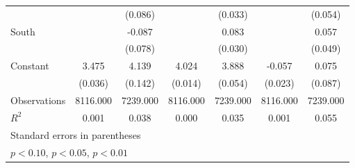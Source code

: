 {\begin{tabular}{l*{6}{c}}
                    &                     &     (0.086)         &                     &     (0.033)         &                     &     (0.054)         \\
\addlinespace
South               &                     &      -0.087         &                     &       0.083\sym{***}&                     &       0.057         \\
                    &                     &     (0.078)         &                     &     (0.030)         &                     &     (0.049)         \\
\addlinespace
Constant            &       3.475\sym{***}&       4.139\sym{***}&       4.024\sym{***}&       3.888\sym{***}&      -0.057\sym{**} &       0.075         \\
                    &     (0.036)         &     (0.142)         &     (0.014)         &     (0.054)         &     (0.023)         &     (0.087)         \\
\midrule
Observations        &    8116.000         &    7239.000         &    8116.000         &    7239.000         &    8116.000         &    7239.000         \\
\(R^{2}\)           &       0.001         &       0.038         &       0.000         &       0.035         &       0.001         &       0.055         \\
\bottomrule
\multicolumn{7}{l}{\footnotesize Standard errors in parentheses}\\
\multicolumn{7}{l}{\footnotesize \sym{*} \(p<0.10\), \sym{**} \(p<0.05\), \sym{***} \(p<0.01\)}\\
\end{tabular}
}
